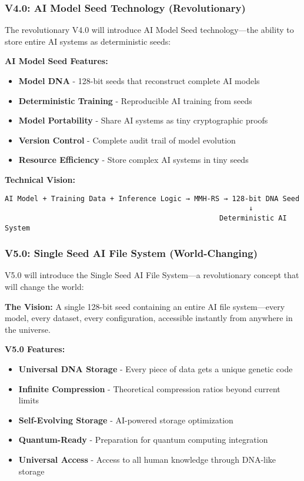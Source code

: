 \documentclass[11pt,a4paper]{article}
\begin{document}
	\subsubsection{V4.0: AI Model Seed Technology (Revolutionary)}

	The revolutionary V4.0 will introduce AI Model Seed technology—the ability to store entire AI systems as deterministic seeds:

	\textbf{AI Model Seed Features:}
	\begin{itemize}
		\item \textbf{Model DNA} - 128-bit seeds that reconstruct complete AI models
		\item \textbf{Deterministic Training} - Reproducible AI training from seeds
		\item \textbf{Model Portability} - Share AI systems as tiny cryptographic proofs
		\item \textbf{Version Control} - Complete audit trail of model evolution
		\item \textbf{Resource Efficiency} - Store complex AI systems in tiny seeds
	\end{itemize}

	\textbf{Technical Vision:}
	\begin{lstlisting}[basicstyle=\ttfamily\small]
	AI Model + Training Data + Inference Logic → MMH-RS → 128-bit DNA Seed
	                                                      ↓
	                                               Deterministic AI System
	\end{lstlisting}

	\subsubsection{V5.0: Single Seed AI File System (World-Changing)}

	V5.0 will introduce the Single Seed AI File System—a revolutionary concept that will change the world:

	\textbf{The Vision:} A single 128-bit seed containing an entire AI file system—every model, every dataset, every configuration, accessible instantly from anywhere in the universe.

	\textbf{V5.0 Features:}
	\begin{itemize}
		\item \textbf{Universal DNA Storage} - Every piece of data gets a unique genetic code
		\item \textbf{Infinite Compression} - Theoretical compression ratios beyond current limits
		\item \textbf{Self-Evolving Storage} - AI-powered storage optimization
		\item \textbf{Quantum-Ready} - Preparation for quantum computing integration
		\item \textbf{Universal Access} - Access to all human knowledge through DNA-like storage
	\end{itemize}
\end{document}
